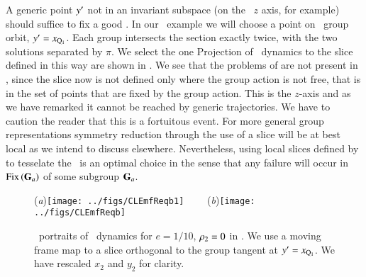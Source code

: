 A generic point ${y'} $ not in an invariant subspace (on
the \CLe\ $z$ axis, for example) should suffice to fix a good
\slice. In our \cLe\ example we will choose a point on \reqv\ group orbit,
 ${y'}  = x_{\mathrm{Q}_{1}}$. 
Each group intersects the section exactly twice,  with the
two solutions separated by $\pi$. We select the one  
 
Projection of \cLe\ dynamics to the slice defined in this way are
shown in . We see that the problems of 
 are not present in , since
the slice now is not defined only where the group action is not free,
that is in the set of points that are fixed by the group action. This
is the $z$-axis and as we have remarked it cannot be reached by generic
trajectories. We have to caution the reader that this is a fortuitous
event. For more general group representations symmetry reduction through
the use of a slice will be at best local as we intend to discuss 
elsewhere. Nevertheless, using local slices defined by 
to tesselate the \reducedsp\ is an optimal choice in the sense that any
failure will occur in \fixedsp\ $\mathrm{Fix}\left(\mathbf{G}_a\right)$ of some subgroup
$\mathbf{G}_a$.


\begin{figure}[ht]
\begin{center}
  (\textit{a})\texttt{[image: ../figs/CLEmfReqb1]}
~~~~(\textit{b})\texttt{[image: ../figs/CLEmfReqb]}
\end{center}
\caption{ \Statesp\
portraits of \cLe\ dynamics for $e=1/10$, $\rho_2=0$
in \reducedsp. We use a moving frame map to a slice orthogonal
to the group tangent at  ${y'}  = x_{\mathrm{Q}_{1}}$. We have rescaled $x_2$ and $y_2$ 
for clarity.
    }
\label{fig:CLEmfReqb1}
\end{figure}


  